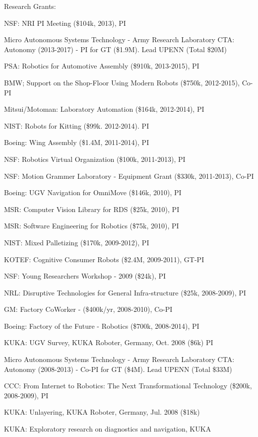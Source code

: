 \documentclass{article}
\begin{document}
\begin{cv}
\begin{cvlist}{Research Grants:}
\item NSF: NRI PI Meeting (\$104k, 2013), PI
\item Micro Autonomous Systems Technology - Army Research Laboratory
  CTA: Autonomy (2013-2017) - PI for GT (\$1.9M). Lead UPENN (Total
  \$20M) %
\item PSA: Robotics for Automotive Assembly (\$910k, 2013-2015), PI
\item BMW; Support on the Shop-Floor Using Modern Robots (\$750k,
  2012-2015), Co-PI
\item Mitsui/Motoman: Laboratory Automation (\$164k, 2012-2014), PI
\item NIST: Robots for Kitting (\$99k. 2012-2014). PI
\item Boeing: Wing Assembly (\$1.4M, 2011-2014), PI
\item NSF: Robotics Virtual Organization (\$100k, 2011-2013), PI
\item NSF: Motion Grammer Laboratory - Equipment Grant (\$330k, 2011-2013), Co-PI
\item Boeing: UGV Navigation for OmniMove (\$146k, 2010), PI
\item MSR: Computer Vision Library for RDS (\$25k, 2010), PI
\item MSR: Software Engineering for Robotics (\$75k, 2010), PI
\item NIST: Mixed Palletizing (\$170k, 2009-2012), PI
\item KOTEF: Cognitive Consumer Robots (\$2.4M, 2009-2011), GT-PI
\item NSF: Young Researchers Workshop - 2009 (\$24k), PI
\item NRL: Disruptive Technologies for General Infra-structure  (\$25k, 2008-2009), PI
\item GM: Factory CoWorker - (\$400k/yr, 2008-2010), Co-PI
\item Boeing: Factory of the Future - Robotics (\$700k, 2008-2014), PI
\item KUKA: UGV Survey, KUKA Roboter, Germany, Oct. 2008 (\$6k)  PI%
\item Micro Autonomous Systems Technology - Army Research Laboratory
  CTA: Autonomy (2008-2013) - Co-PI for GT (\$4M). Lead UPENN (Total \$33M) %
\item CCC: From Internet to Robotics: The Next Transformational
  Technology (\$200k, 2008-2009), PI %
\item KUKA: Unlayering, KUKA Roboter, Germany, Jul. 2008 (\$18k) %
\item KUKA: Exploratory research on diagnostics and navigation, KUKA

\end{cvlist}
\end{cv}
\end{document}
